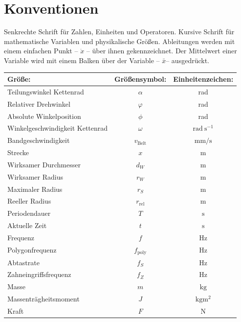 \cleardoublepage 
\chapter*{Konventionen}
Senkrechte Schrift für Zahlen, Einheiten und Operatoren. Kursive Schrift für mathematische Variablen und physikalische Größen. Ableitungen werden mit einem einfachen Punkt -- $\dot{x}$ -- über ihnen gekennzeichnet. Der Mittelwert einer Variable wird mit einem Balken über der Variable -- $\bar{x}$-- ausgedrückt.
\begin{table}[H]
\centering
\begin{tabular}{l|c|c}
    \textbf{Größe:}&\textbf{Größensymbol:} & \textbf{Einheitenzeichen:} \\
    \hline
    Teilungswinkel Kettenrad 		& $\alpha$ 			& rad\\
    Relativer Drehwinkel 			& $\varphi$ 		& rad\\
	Absolute Winkelposition 		& $\phi$ 			& rad\\
	Winkelgeschwindigkeit Kettenrad & $\omega$ 			& $\mathrm{rad} \ \mathrm{s}^{-1}$\\
    Bandgeschwindigkeit 			& $v_\mathrm{Belt}$ & $\si{\milli\m\per\s}$\\
	Strecke 						& $x$ 				& $\si{\m}$\\
    Wirksamer Durchmesser 			& $d_W$ 			& $\si{\m}$\\
    Wirksamer Radius 				& $r_W$ 			& $\si{\m}$\\
    Maximaler Radius 				& $r_S$ 			& $\si{\m}$\\
	Reeller Radius 					& $r_\mathrm{rel}$	& $\si{\m}$\\
    Periodendauer 					& $T$				& $\si{\s}$\\
	Aktuelle Zeit 					& $t$				& $\si{\s}$\\
    Frequenz 						& $f$				& $\si{\Hz}$\\
	Polygonfrequenz 				& $f_\mathrm{poly}$ & $\si{\Hz}$\\
	Abtastrate 						& $f_S$ 			& $\si{\Hz}$\\
	Zahneingriffsfrequenz 			& $f_Z$ 			& $\si{\Hz}$\\
	Masse 							& $m$ 				& $\si{\kg}$\\
    Massenträgheitsmoment 			& $J$ 				& $\si{\kg\square\m}$\\
	Kraft 							& $F$ 				& $\si{\N}$\\

\end{tabular}
\end{table}
